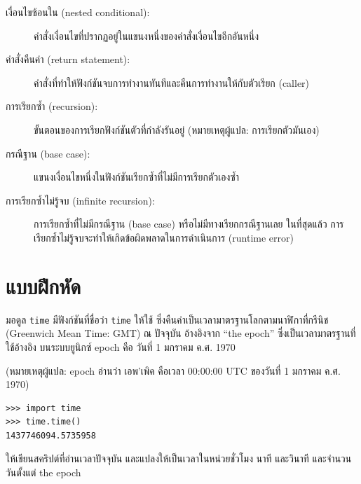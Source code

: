 \begin{description}
\item[เงื่อนไขซ้อนใน (nested conditional):]  คำสั่งเงื่อนไขที่ปรากฏอยู่ในแขนงหนึ่งของคำสั่งเงื่อนไขอีกอันหนึ่ง

\item[คำสั่งคืนค่า (return statement):] คำสั่งที่ทำให้ฟังก์ชันจบการทำงานทันทีและคืนการทำงานให้กับตัวเรียก (caller)

\item[การเรียกซ้ำ (recursion):] ขั้นตอนของการเรียกฟังก์ชันตัวที่กำลังรันอยู่ (หมายเหตุผู้แปล: การเรียกตัวมันเอง) 

\item[กรณีฐาน (base case):]  แขนงเงื่อนไขหนึ่งในฟังก์ชันเรียกซ้ำที่ไม่มีการเรียกตัวเองซ้ำ

\item[การเรียกซ้ำไม่รู้จบ (infinite recursion):]  การเรียกซ้ำที่ไม่มีกรณีฐาน (base case) หรือไม่มีทางเรียกกรณีฐานเลย
ในที่สุดแล้ว การเรียกซ้ำไม่รู้จบจะทำให้เกิดข้อผิดพลาดในการดำเนินการ (runtime error) 

\end{description}

\section{แบบฝึกหัด}

\begin{exercise}

มอดูล {\tt time}  มีฟังก์ชันที่ชื่อว่า {\tt time} ให้ใช้ ซึ่งคืนค่าเป็นเวลามาตรฐานโลกตามนาฬิกาที่กรีนิช 
(Greenwich Mean Time: GMT) ณ ปัจจุบัน อ้างอิงจาก ``the epoch'' ซึ่งเป็นเวลามาตรฐานที่ใช้อ้างอิง 
บนระบบยูนิกซ์  epoch คือ วันที่ 1 มกราคม ค.ศ. 1970

(หมายเหตุผู้แปล: epoch อ่านว่า เอพ'เพิค คือเวลา 00:00:00 UTC ของวันที่ 1 มกราคม ค.ศ. 1970)

\begin{verbatim}
>>> import time
>>> time.time()
1437746094.5735958
\end{verbatim}

ให้เขียนสคริปต์ที่อ่านเวลาปัจจุบัน และแปลงให้เป็นเวลาในหน่วยชั่วโมง นาที และวินาที และจำนวนวันตั้งแต่ the epoch

\end{exercise}


